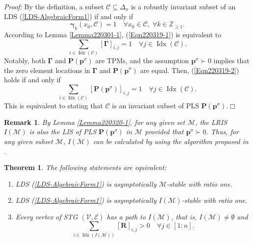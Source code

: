 \documentclass[11pt,onecolumn]{article}
\DeclareMathOperator{\idx}{Idx}
\newtheorem{theorem}{Theorem}
\newtheorem{remark}{Remark}
\begin{document}
{\it Proof:}  By the definition, a subset $\mathcal{C}\subseteq\Delta_n$ is a robustly invariant subset of an LDS (\ref{LDS-AlgebraicForm1}) if and only if
   \begin{equation}\label{Eqn220319-1}
      \boldsymbol\gamma_k(x_0,\mathcal C)=1\quad\forall x_0\in\mathcal C,\;\forall k\in\mathbb Z_{\geq1}.
   \end{equation}
   According to Lemma \ref{Lemma220301-1}, (\ref{Eqn220319-1}) is equivalent to
   \begin{equation}\label{Eqn220319-2}
      \sum_{i\in\idx(\mathcal C)}[\boldsymbol\Gamma]_{i,j}=1\quad\forall j\in\idx(\mathcal C).
   \end{equation}
   Notably, both $\boldsymbol\Gamma$ and $\mathbf P(\boldsymbol p^\sigma)$ are TPMs, and  the assumption $\boldsymbol p^\sigma\succ0$ implies that the zero element locations in $\boldsymbol\Gamma$ and $\mathbf P(\boldsymbol p^\sigma)$ are equal. Then, (\ref{Eqn220319-2}) holds if and only if
   \begin{equation}\label{Eqn220319-3}
      \sum_{i\in\idx(\mathcal C)}[\mathbf P(\boldsymbol p^\sigma)]_{i,j}=1\quad\forall j\in\idx(\mathcal C).
   \end{equation}
   This is equivalent to stating that $\mathcal C$ is an invariant subset of PLS $\mathbf P(\boldsymbol p^\sigma)$.\hfill $\Box$



\begin{remark}
   By Lemma \ref{Lemma220320-1}, for any given set $\mathcal M$, the LRIS $I(\mathcal M)$ is also the LIS of PLS $\mathbf P(\boldsymbol p^\sigma)$ in $\mathcal M$ provided that $\boldsymbol p^\sigma\succ0$. Thus, for any given subset $\mathcal M$, $I(\mathcal M)$ can be calculated by using the algorithm proposed in \cite{Guo2019Stability}.
\end{remark}


   \begin{theorem}\label{theorem6}
   The following statements are equivalent:
   \begin{enumerate}
      \item LDS (\ref{LDS-AlgebraicForm1}) is asymptotically $\mathcal M$-stable with ratio one.
      \item LDS (\ref{LDS-AlgebraicForm1}) is asymptotically $I(\mathcal M)$-stable with ratio one.
      \item Every vertex of STG $(\mathcal V,\mathcal E)$ has a path to $I(\mathcal M)$, that is, $I(\mathcal M)\neq\emptyset$ and
       \begin{equation}\label{Eqn220320-1}
          \sum_{i\in\idx(I(\mathcal M))}[\mathbf R]_{i,j}>0\quad\forall j\in[1:n].
       \end{equation}
   \end{enumerate}


   \end{theorem}
\end{document}
